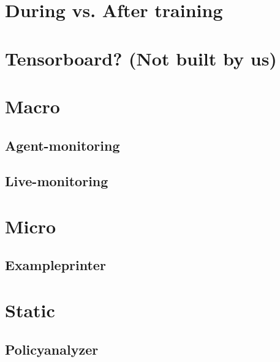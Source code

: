 \section{During vs. After training}
\section{Tensorboard? (Not built by us)}
\section{Macro}
\subsection{Agent-monitoring}
\subsection{Live-monitoring}
\section{Micro}
\subsection{Exampleprinter}
\section{Static}
\subsection{Policyanalyzer}